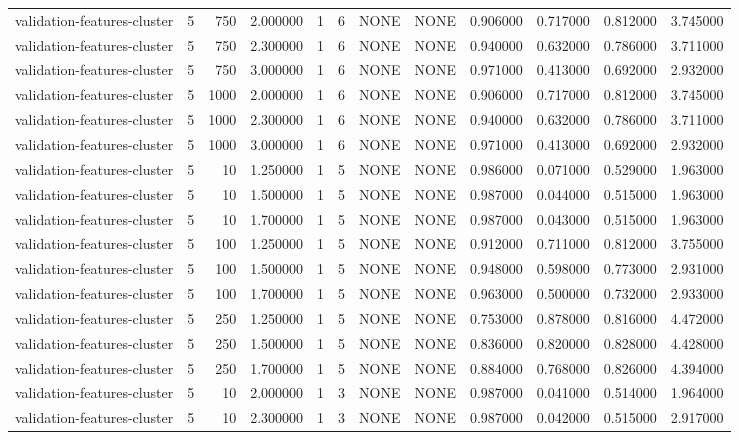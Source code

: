 \begin{tabular}{lrrrllllrrrr}
validation-features-cluster & 5 & 750 & 2.000000 & 1 & 6 & NONE & NONE & 0.906000 & 0.717000 & 0.812000 & 3.745000 \\
validation-features-cluster & 5 & 750 & 2.300000 & 1 & 6 & NONE & NONE & 0.940000 & 0.632000 & 0.786000 & 3.711000 \\
validation-features-cluster & 5 & 750 & 3.000000 & 1 & 6 & NONE & NONE & 0.971000 & 0.413000 & 0.692000 & 2.932000 \\
validation-features-cluster & 5 & 1000 & 2.000000 & 1 & 6 & NONE & NONE & 0.906000 & 0.717000 & 0.812000 & 3.745000 \\
validation-features-cluster & 5 & 1000 & 2.300000 & 1 & 6 & NONE & NONE & 0.940000 & 0.632000 & 0.786000 & 3.711000 \\
validation-features-cluster & 5 & 1000 & 3.000000 & 1 & 6 & NONE & NONE & 0.971000 & 0.413000 & 0.692000 & 2.932000 \\
validation-features-cluster & 5 & 10 & 1.250000 & 1 & 5 & NONE & NONE & 0.986000 & 0.071000 & 0.529000 & 1.963000 \\
validation-features-cluster & 5 & 10 & 1.500000 & 1 & 5 & NONE & NONE & 0.987000 & 0.044000 & 0.515000 & 1.963000 \\
validation-features-cluster & 5 & 10 & 1.700000 & 1 & 5 & NONE & NONE & 0.987000 & 0.043000 & 0.515000 & 1.963000 \\
validation-features-cluster & 5 & 100 & 1.250000 & 1 & 5 & NONE & NONE & 0.912000 & 0.711000 & 0.812000 & 3.755000 \\
validation-features-cluster & 5 & 100 & 1.500000 & 1 & 5 & NONE & NONE & 0.948000 & 0.598000 & 0.773000 & 2.931000 \\
validation-features-cluster & 5 & 100 & 1.700000 & 1 & 5 & NONE & NONE & 0.963000 & 0.500000 & 0.732000 & 2.933000 \\
validation-features-cluster & 5 & 250 & 1.250000 & 1 & 5 & NONE & NONE & 0.753000 & 0.878000 & 0.816000 & 4.472000 \\
validation-features-cluster & 5 & 250 & 1.500000 & 1 & 5 & NONE & NONE & 0.836000 & 0.820000 & 0.828000 & 4.428000 \\
validation-features-cluster & 5 & 250 & 1.700000 & 1 & 5 & NONE & NONE & 0.884000 & 0.768000 & 0.826000 & 4.394000 \\
validation-features-cluster & 5 & 10 & 2.000000 & 1 & 3 & NONE & NONE & 0.987000 & 0.041000 & 0.514000 & 1.964000 \\
validation-features-cluster & 5 & 10 & 2.300000 & 1 & 3 & NONE & NONE & 0.987000 & 0.042000 & 0.515000 & 2.917000 \\

\end{tabular}
